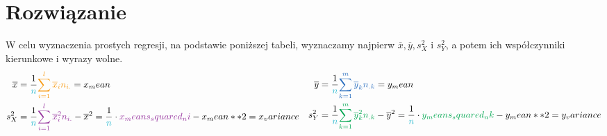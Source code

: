 \documentclass{article}
\begin{document}
\section{Rozwiązanie}
W celu wyznaczenia prostych regresji, na podstawie poniższej tabeli, wyznaczamy
najpierw $\overline{x}, \overline{y}, s^2_X$ i $s^2_Y$, a potem ich współczynniki
kierunkowe i wyrazy wolne.
\begin{equation*}
\begin{aligned}[c]
    \overline{x} = \frac{1}{\textcolor{Turquoise}{n}} &\textcolor{YellowOrange}{\sum^{l}_{i=1} \overline{x}_i n_{i.}} = {{ x_mean }} \\
    s^2_X = \frac{1}{\textcolor{Turquoise}{n}} &\textcolor{Purple}{\sum^{l}_{i=1} \overline{x}_i^2 n_{i.}} - {\overline{x}}^2 =
    \frac{1}{ \textcolor{Turquoise}{ {{ n }} } } \cdot \textcolor{Purple}{ {{ x_means_squared_ni }} } - {{ x_mean ** 2 }} =
    {{ x_variance }} \\
\end{aligned}
    \hspace{1em}
\begin{aligned}[c]
    \overline{y} = \frac{1}{\textcolor{Turquoise}{n}} &\textcolor{NavyBlue}{\sum^{m}_{k=1} \overline{y}_k n_{.k}} = {{ y_mean }} \\
    s^2_Y = \frac{1}{\textcolor{Turquoise}{n}} &\textcolor{Green}{\sum^{m}_{k=1} \overline{y}_k^2 n_{.k}} - {\overline{y}}^2 =
    \frac{1}{ \textcolor{Turquoise}{ {{ n }} } } \cdot \textcolor{Green}{ {{ y_means_squared_nk }} } - {{ y_mean ** 2 }} =
    {{ y_variance }} \\
\end{aligned}
\end{equation*}
\end{document}
